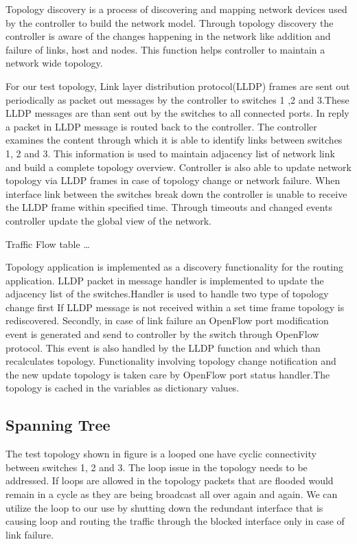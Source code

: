 Topology discovery is a process of discovering and mapping network devices used by the controller to build the network model. Through topology discovery the controller is aware of the changes happening in the network like addition and failure of links, host and nodes. This function helps controller to maintain a network wide topology.

For our test topology, Link layer distribution protocol(LLDP) frames are sent out periodically as packet out messages by the controller to switches 1 ,2 and 3.These LLDP messages are than sent out by the switches to all connected ports. In reply a packet in LLDP message is routed back to the controller. The controller examines the content through which it is able to identify links between switches 1, 2 and 3. This information is used to maintain adjacency list of network link and build a complete topology overview. Controller is also able to update network topology via LLDP frames in case of topology change or network failure. When interface link between the switches break down the controller is unable to receive the LLDP frame within specified time. Through timeouts and changed events controller update the global view of the network.

Traffic Flow table \ldots

Topology application is implemented as a discovery functionality for the routing application. LLDP packet in message handler is implemented to update the adjacency list of the switches.Handler is used to handle two type of topology change first If LLDP message is not received within a set time frame topology is rediscovered. Secondly, in case of link failure an OpenFlow port modification event is generated and send to controller by the switch through OpenFlow protocol. This  event is also handled by the LLDP function and which than recalculates topology. Functionality involving topology change notification and the new update topology is taken care by OpenFlow port status handler.The topology is cached in the variables as dictionary values. 


\subsection{Spanning Tree}

The test topology shown in figure is a looped one have cyclic connectivity between switches 1, 2 and 3. The loop issue in the topology needs to be addressed. If loops are allowed in the topology packets that are flooded would remain in a cycle as they are being broadcast all over again and again. We can utilize the loop to our use by shutting down the redundant interface that is causing loop and routing the traffic through the blocked interface only in case of link failure.

